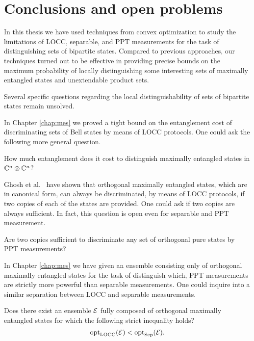\chapter{Conclusions and open problems}
\label{chap:conclusions}

In this thesis we have used techniques from convex optimization to study 
the limitations of LOCC, separable, and PPT measurements for the task of 
distinguishing sets of bipartite states. Compared to previous approaches,
our techniques turned out to be effective in providing precise bounds on 
the maximum probability of locally distinguishing some interesting sets 
of maximally entangled states and unextendable product sets.

Several specific questions regarding the local distinguishability of sets of 
bipartite states remain unsolved.

In Chapter \ref{chap:mes} we proved a tight bound on the entanglement
cost of discriminating sets of Bell states by means of LOCC protocols. 
One could ask the following more general question.
\begin{question}
How much entanglement does it cost to distinguish 
maximally entangled states in $\mathbb{C}^{n}\otimes\mathbb{C}^{n}$?
\end{question}

Ghosh et al.~\cite{Ghosh04} have shown that orthogonal maximally
entangled states, which are in canonical form, can always be discriminated,
by means of LOCC protocols, if two copies of each of the states are provided.
One could ask if two copies are always sufficient. In fact, this question is open
even for separable and PPT measurement.
\begin{question}
Are two copies sufficient to discriminate any set of orthogonal pure states 
by PPT measurements?
\end{question}

In Chapter \ref{chap:mes} we have given an ensemble consisting only of 
orthogonal maximally entangled states for the task of distinguish which, 
PPT measurements are strictly more powerful than separable measurements.
One could inquire into a similar separation between LOCC and separable measurements.

\begin{question}
Does there exist an ensemble $\mathcal{E}$ fully composed of orthogonal maximally entangled 
states for which the following strict inequality holds?
  \begin{equation}
    \operatorname{opt}_{\mathrm{LOCC}}(\mathcal{E}) < \operatorname{opt}_{\mathrm{Sep}}(\mathcal{E}).
  \end{equation}
\end{question}

